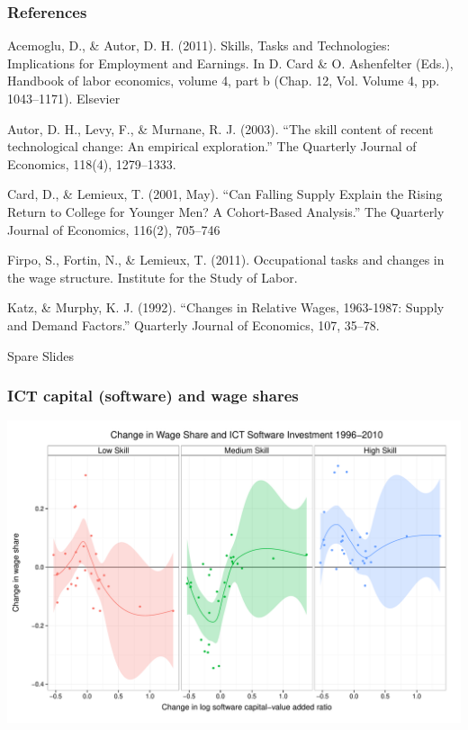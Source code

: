 \documentclass[red]{beamer}
\begin{document}
\begin{frame}
\frametitle{References}
{ \scriptsize
Acemoglu, D., \& Autor, D. H. (2011). Skills, Tasks and Technologies: Implications for Employment and Earnings. In D. Card \& O. Ashenfelter (Eds.), Handbook of labor economics, volume 4, part b (Chap. 12, Vol. Volume 4, pp. 1043–1171). Elsevier
\vfill

Autor, D. H., Levy, F., \& Murnane, R. J. (2003). “The skill content of recent technological change: An empirical exploration.” The Quarterly Journal of Economics, 118(4), 1279–1333.
\vfill

Card, D., \& Lemieux, T. (2001, May). “Can Falling Supply Explain the Rising Return to College for Younger Men? A Cohort-Based Analysis.” The Quarterly Journal of Economics, 116(2), 705–746
\vfill

Firpo, S., Fortin, N., \& Lemieux, T. (2011). Occupational tasks and changes in the wage structure. Institute for the Study of Labor.
\vfill

Katz, \& Murphy, K. J. (1992). “Changes in Relative Wages, 1963-1987: Supply and Demand Factors.” Quarterly Journal of Economics, 107, 35–78.
}
\end{frame}

\begin{frame}
  \begin{center}
    Spare Slides
  \end{center}
\end{frame}

\begin{frame}[c]
  \frametitle{ICT capital (software) and wage shares}
\begin{center}
\includegraphics[width=\textwidth]{slides_fig/wage_share_software_skill.pdf}
\end{center}
\end{frame}
\end{document}
